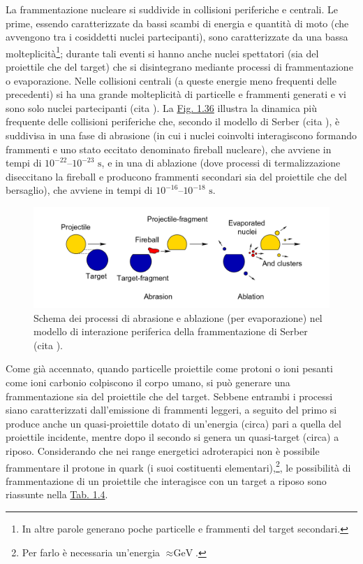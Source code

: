 \documentclass[12pt,a4paper,twoside]{report}
\begin{document}
	La frammentazione nucleare si suddivide in collisioni periferiche e centrali. Le prime, essendo caratterizzate da bassi scambi di energia e quantità di moto (che avvengono tra i cosiddetti nuclei partecipanti), sono caratterizzate da una bassa molteplicità\footnote{In altre parole generano poche particelle e frammenti del target secondari.}; durante tali eventi si hanno anche nuclei spettatori (sia del proiettile che del target) che si disintegrano mediante processi di frammentazione o evaporazione. Nelle collisioni centrali (a queste energie meno frequenti delle precedenti) si ha una grande molteplicità di particelle e frammenti generati e vi sono solo nuclei partecipanti (cita
	). La \hyperref[fig:fragmentation]{Fig. 1.36} illustra la dinamica più frequente delle collisioni periferiche che, secondo il modello di Serber (cita
	), è suddivisa in una fase di abrasione (in cui i nuclei coinvolti interagiscono formando frammenti e uno stato eccitato denominato fireball nucleare), che avviene in tempi di $10^{-22}$--$10^{-23}\mbox{ s}$, e in una di ablazione (dove processi di termalizzazione diseccitano la fireball e producono frammenti secondari sia del proiettile che del bersaglio), che avviene in tempi di $10^{-16}$--$10^{-18}\mbox{ s}$.
	\begin{figure}[H]
		\centering
		\includegraphics[width=0.9\linewidth]{fragmentation.png}
		\caption{Schema dei processi di abrasione e ablazione (per evaporazione) nel modello di interazione periferica della frammentazione di Serber (cita
			).}
		\label{fig:fragmentation}
	\end{figure}
	Come già accennato, quando particelle proiettile come protoni o ioni pesanti come ioni carbonio colpiscono il corpo umano, si può generare una frammentazione sia del proiettile che del target. Sebbene entrambi i processi siano caratterizzati dall'emissione di frammenti leggeri, a seguito del primo si produce anche un quasi-proiettile dotato di un'energia (circa) pari a quella del proiettile incidente, mentre dopo il secondo si genera un quasi-target (circa) a riposo. Considerando che nei range energetici adroterapici non è possibile frammentare il protone in quark (i suoi costituenti elementari),\footnote{Per farlo è necessaria un'energia $\approx\mbox{GeV}$.}, le possibilità di frammentazione di un proiettile che interagisce con un target a riposo sono riassunte nella \hyperref[tab:fragmentation]{Tab. 1.4}.
\end{document}
